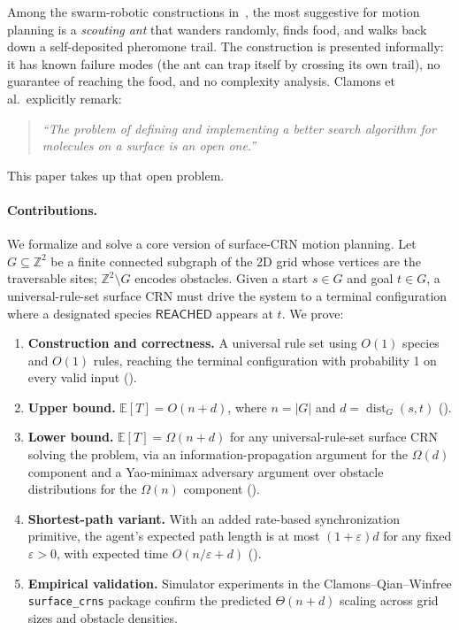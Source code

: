 \documentclass[11pt]{article}
\theoremstyle{plain}
\theoremstyle{definition}
\theoremstyle{remark}
\newcommand{\Z}{\mathbb{Z}}
\newcommand{\E}{\mathbb{E}}
\DeclareMathOperator{\dist}{dist}
\begin{document}
Among the swarm-robotic constructions in~\cite{clamons2020}, the most suggestive for motion planning is a \emph{scouting ant} that wanders randomly, finds food, and walks back down a self-deposited pheromone trail. The construction is presented informally: it has known failure modes (the ant can trap itself by crossing its own trail), no guarantee of reaching the food, and no complexity analysis. Clamons et al.\ explicitly remark:
\begin{quote}
\emph{``The problem of defining and implementing a better search algorithm for molecules on a surface is an open one.''}~\cite[\S 6]{clamons2020}
\end{quote}
This paper takes up that open problem.

\paragraph{Contributions.} We formalize and solve a core version of surface-CRN motion planning. Let $G \subseteq \Z^2$ be a finite connected subgraph of the 2D grid whose vertices are the traversable sites; $\Z^2 \setminus G$ encodes obstacles. Given a start $s \in G$ and goal $t \in G$, a universal-rule-set surface CRN must drive the system to a terminal configuration where a designated species $\mathsf{REACHED}$ appears at $t$. We prove:
\begin{enumerate}
    \item \textbf{Construction and correctness.} A universal rule set using $O(1)$ species and $O(1)$ rules, reaching the terminal configuration with probability 1 on every valid input ().
    \item \textbf{Upper bound.} $\E[T] = O(n + d)$, where $n = |G|$ and $d = \dist_G(s,t)$ ().
    \item \textbf{Lower bound.} $\E[T] = \Omega(n + d)$ for any universal-rule-set surface CRN solving the problem, via an information-propagation argument for the $\Omega(d)$ component and a Yao-minimax adversary argument over obstacle distributions for the $\Omega(n)$ component ().
    \item \textbf{Shortest-path variant.} With an added rate-based synchronization primitive, the agent's expected path length is at most $(1+\varepsilon)d$ for any fixed $\varepsilon > 0$, with expected time $O(n/\varepsilon + d)$ ().
    \item \textbf{Empirical validation.} Simulator experiments in the Clamons--Qian--Winfree \texttt{surface\_crns} package confirm the predicted $\Theta(n+d)$ scaling across grid sizes and obstacle densities.
\end{enumerate}
\end{document}
